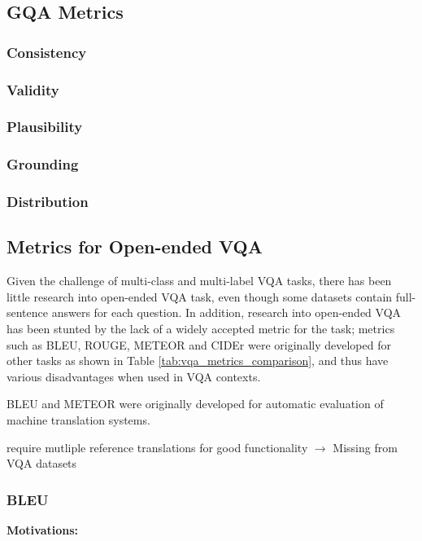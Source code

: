 \subsection{GQA Metrics}
\subsubsection{Consistency}
\subsubsection{Validity}
\subsubsection{Plausibility}
\subsubsection{Grounding}
\subsubsection{Distribution}

\subsection{Metrics for Open-ended VQA}
\label{subsection:open_ended_vqa_metrics}

Given the challenge of multi-class and multi-label VQA tasks, there has been little research into open-ended VQA task, even though some datasets contain full-sentence answers for each question. In addition, research into open-ended VQA has been stunted by the lack of a widely accepted metric for the task; metrics such as BLEU,  ROUGE, METEOR and CIDEr were originally developed for other tasks as shown in Table \ref{tab:vqa_metrics_comparison}, and thus have various disadvantages when used in VQA contexts.

BLEU and METEOR were originally developed for automatic evaluation of machine translation systems.

{\color{red} require mutliple reference translations for good functionality \(\rightarrow\) Missing from VQA datasets}

\subsubsection{BLEU}

\textbf{Motivations:}

